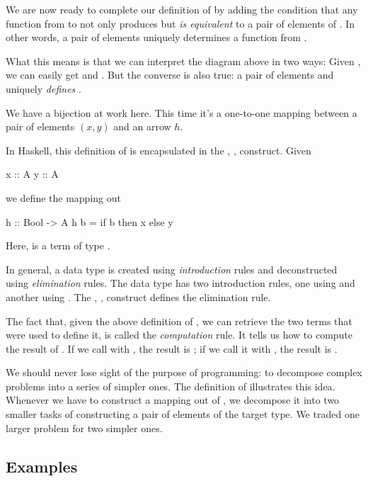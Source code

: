 \documentclass[DaoFP]{subfiles}
\begin{document}
We are now ready to complete our definition of  by adding the condition that any function from  to  not only produces but \emph{is equivalent} to a pair of elements of . In other words, a pair of elements uniquely determines a function from . 

What this means is that we can interpret the diagram above in two ways: Given , we can easily get  and . But the converse is also true: a pair of elements  and  uniquely \emph{defines} .

We have a bijection at work here. This time it's a one-to-one mapping between a pair of elements $(x, y)$ and an arrow $h$. 

In Haskell, this definition of  is encapsulated in the , ,  construct. Given
\begin{haskell}
x :: A
y :: A
\end{haskell}
we define the mapping out
\begin{haskell}
h :: Bool -> A
h b = if b then x else y
\end{haskell}
Here,  is a term of type . 

In general, a data type is created using \emph{introduction} rules and deconstructed using \emph{elimination} rules. The  data type has two introduction rules, one using  and another using . The , ,  construct defines the elimination rule. 

The fact that, given the above definition of , we can retrieve the two terms that were used to define it, is called the \emph{computation} rule. It tells us how to compute the result of . If we call  with , the result is ; if we call it with , the result is .

We should never lose sight of the purpose of programming: to decompose complex problems into a series of simpler ones. The definition of  illustrates this idea. Whenever we have to construct a mapping out of , we decompose it into two smaller tasks of constructing a pair of elements of the target type. We traded one larger problem for two simpler ones.

\subsection{Examples}
\end{document}
